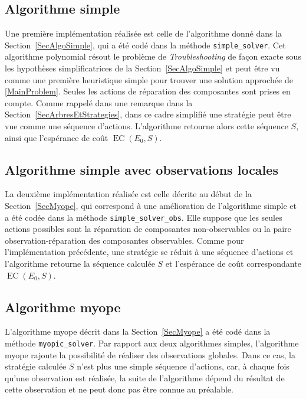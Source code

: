 \documentclass[a4paper,11pt]{article}
\theoremstyle{plain}
\theoremstyle{definition}
\DeclareMathOperator{\EC}{EC}
\begin{document}
\subsection{Algorithme simple}
\label{SecImplAlgoSimple}

Une première implémentation réalisée est celle de l'algorithme donné dans la Section~\ref{SecAlgoSimple}, qui a été codé dans la méthode \texttt{simple\_solver}. Cet algorithme polynomial résout le problème de \emph{Troubleshooting} de façon exacte sous les hypothèses simplificatrices de la Section~\ref{SecAlgoSimple} et peut être vu comme une première heuristique simple pour trouver une solution approchée de \eqref{MainProblem}. Seules les actions de réparation des composantes sont prises en compte. Comme rappelé dans une remarque dans la Section~\ref{SecArbresEtStrategies}, dans ce cadre simplifié une stratégie peut être vue comme une séquence d'actions. L'algorithme retourne alors cette séquence $S$, ainsi que l'espérance de coût $\EC(E_0, S)$.

\subsection{Algorithme simple avec observations locales}
\label{SecImplAlgoSimpleObs}

La deuxième implémentation réalisée est celle décrite au début de la Section~\ref{SecMyope}, qui correspond à une amélioration de l'algorithme simple et a été codée dans la méthode \texttt{simple\_solver\_\allowbreak{}obs}. Elle suppose que les seules actions possibles sont la réparation de composantes non-ob\-ser\-vables ou la paire observation-réparation des composantes observables. Comme pour l'implémentation précédente, une stratégie se réduit à une séquence d'actions et l'algorithme retourne la séquence calculée $S$ et l'espérance de coût correspondante $\EC(E_0, S)$.

\subsection{Algorithme myope}
\label{SecImplMyope}

L'algorithme myope décrit dans la Section~\ref{SecMyope} a été codé dans la méthode \texttt{myopic\_solver}. Par rapport aux deux algorithmes simples, l'algorithme myope rajoute la possibilité de réaliser des observations globales. Dans ce cas, la stratégie calculée $S$ n'est plus une simple séquence d'actions, car, à chaque fois qu'une observation est réalisée, la suite de l'algorithme dépend du résultat de cette observation et ne peut donc pas être connue au préalable.
\end{document}
